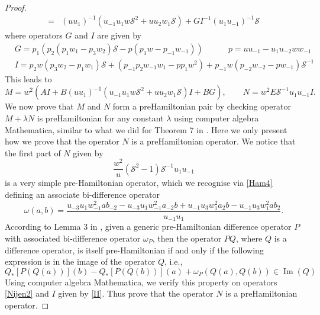 \documentclass{article}
\numberwithin{equation}{section}
\DeclareMathOperator{\Ima}{Im}
\begin{document}
\begin{proof}
\begin{equation*}
\begin{split}
 = &  \left({u u_1}\right)^{-1}\left(u_{-1} u_1 w \mathcal{S}^2+u u_2 w_1 \mathcal{S}\right) + G I^{-1}(u_1 u_{-1})^{-1} \mathcal{S}
\end{split}
\end{equation*}
where operators $G$ and $I$ are given by
\begin{equation}\label{II}
\begin{split}
&G=  p_1\left(p_2\left(p_1 w_1-p_3 w_2 \right)\mathcal{S}- p \left(p_1 w - p_{-1}w_{-1}\right)\right) \qquad \quad p= u u_{-1}-u_1 u_{-2} w w_{-1} \\
&I=  p_2 w\left(p_3 w_2-p_1 w_1\right)\mathcal{S}+\left(p_{-1}p_2 w_{-1} w_1 - p p_1 w^2\right) +p_{-1} w\left(p_{-2} w_{-2}-p w_{-1}\right)\mathcal{S}^{-1}
\end{split}
\end{equation}
This leads to
$$
M= w^2 \left(A I + B \left({u u_1}\right)^{-1}\left(u_{-1} u_1 w \mathcal{S}^2+u u_2 w_1 \mathcal{S}\right) I + B G\right), \qquad
N= w^2 E \mathcal{S}^{-1} u_1 u_{-1} I.
$$
We now prove that $M$ and $N$ form a preHamiltonian pair by checking operator
$M+\lambda N$ is preHamiltonian for any constant $\lambda$ using computer algebra Mathematica,
similar to what we did for Theorem 7 in \cite{4}. Here we only present how we prove that
the operator $N$ is a preHamiltonian operator.
We notice that the first part of $N$ given by
		\begin{equation}
            \frac{w^2}{u}\left( 
\mathcal{S}^2-1\right)\mathcal{S}^{-1} u_1 u_{-1}
			\label{Nijen2}
		\end{equation}
is a very simple pre-Hamiltonian operator, which we recognise via \eqref{Ham4} defining an associate bi-difference operator
		\begin{equation*}
			\omega(a,b) = \frac{u_{-3} u_1 w_{-1}^2 a 
b_{-2}-u_{-3} u_1 w_{-1}^2 a_{-2} b +u_{-1} u_3 w_1^2 a_2 b -u_{-1} u_3 w_1^2 a 
b_2}{u_{-1} u_1} .
			\label{Nijen3}
		\end{equation*}
		According to Lemma 3 in \cite{42}, given a generic
pre-Hamiltonian difference operator $P$ with associated bi-difference operator
$\omega_P$, then the operator $P Q$, where $Q$ is a difference operator,
is itself pre-Hamiltonian if and only if the following expression is in the image of
the operator $Q$, i.e.,
		\begin{equation*}
			Q_*[P(Q(a))](b)-Q_*[P(Q(b))](a)+\omega_P(Q(a),Q(b)) \in
\Ima\left(Q\right)
		\end{equation*}
Using computer algebra Mathematica,  we verify this property on operators
\eqref{Nijen2} and $I$ given by \eqref{II}. Thus prove that the operator $N$ is a preHamiltonian operator.
	\end{proof}
\end{document}
